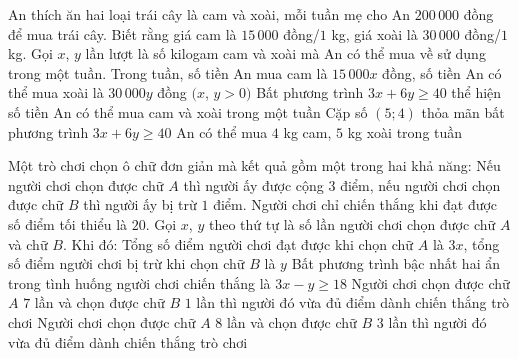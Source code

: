\begin{ex}%
	An thích ăn hai loại trái cây  là cam và xoài, mỗi tuần mẹ cho An $200\,000$ đồng để mua trái cây. Biết rằng giá cam là $15\,000$ đồng/$1$ kg, giá xoài là $30\,000$ đồng/$1$ kg. Gọi $x$, $y$ lần lượt là số kilogam cam và xoài mà An có thể mua về sử dụng trong một tuần.
	\choiceTF 
		{Trong tuần, số tiền An mua cam là $15\,000x$ đồng, số tiền An có thể mua  xoài là $30\,000y$ đồng $(x$, $y > 0)$}
		{ Bất phương trình $3x + 6y \geq 40$ thể hiện số tiền An có thể mua cam và  xoài trong một tuần}
		{\True Cặp số $(5; 4)$ thỏa mãn bất phương trình $3x + 6y \geq 40$} 
		{ An có thể mua $4$ kg cam, $5$ kg xoài trong tuần} 
\end{ex}

\begin{ex}%
	Một trò chơi chọn ô chữ đơn giản mà kết quả gồm một trong hai khả năng: Nếu người chơi chọn được chữ $A$ thì người ấy được cộng $3$ điểm, nếu người chơi chọn được chữ $B$ thì người ấy bị  trừ $1$ điểm. Người chơi chỉ chiến thắng khi đạt được số điểm tối thiểu là $20$. Gọi $x$, $y$ theo thứ tự là số lần người chơi chọn được chữ $A$ và chữ $B$. Khi đó:
	\choiceTF 
		 {\True Tổng số điểm người chơi đạt được khi chọn chữ $A$ là $3x$, tổng số điểm người chơi bị trừ khi chọn chữ $B$ là $y$}
		{Bất phương trình bậc nhất hai ẩn trong tình huống người chơi chiến thắng  là $3x - y \geq 18$}
		{\True Người chơi chọn được chữ $A$ $7$ lần và chọn được chữ $B$ $1$ lần thì người đó vừa  đủ điểm dành chiến thắng trò chơi}
		{\True Người  chơi chọn được chữ $A$ $8$ lần và chọn được chữ $B$ $3$ lần thì người đó vừa đủ điểm dành chiến thắng trò chơi}
\end{ex}

